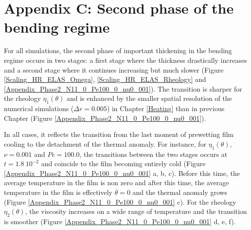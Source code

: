 \section*{Appendix C: Second phase of the bending regime}
\label{Heat:AppendixC}

For all simulations,  the second phase of important  thickening in the
bending regime occurs in two stages: a first stage where the thickness
drastically increases and a second stage where it continues increasing
but      much     slower      (Figure     \ref{Scaling_HR_ELAS_Omega},
\ref{Scaling_HR_ELAS_Rheology}                                     and
\ref{Appendix_Phase2_N11_0_Pe100_0_nu0_001}).    The   transition   is
sharper  for the  rheology  $\eta_1(\theta)$ and  is  enhanced by  the
smaller    spatial   resolution    of   the    numerical   simulations
($\Delta r = 0.005$) in Chapter \ref{Heating} than in previous Chapter
(Figure \ref{Appendix_Phase2_N11_0_Pe100_0_nu0_001}).

In  all cases,  it reflects  the transition  from the  last moment  of
prewetting film cooling to the  detachment of the thermal anomaly. For
instance,  for  $\eta_1(\theta)$,   $\nu=0.001$  and  $Pe=100.0$,  the
transitions  between  the two  stages  occurs  at $t=1.8~10^{-2}$  and
coincide    to   the    film    becoming    entirely   cold    (Figure
\ref{Appendix_Phase2_N11_0_Pe100_0_nu0_001}  a,  b, c).   Before  this
time, the average  temperature in the film is non  zero and after this
time,   the   average  temperature   in   the   film  is   effectively
$\overline{\theta}=0$   and   the   thermal  anomaly   grows   (Figure
\ref{Appendix_Phase2_N11_0_Pe100_0_nu0_001}  c).    For  the  rheology
$\eta_2(\theta)$,  the   viscosity  increases  on  a   wide  range  of
temperature    and     the    transition    is     smoother    (Figure
\ref{Appendix_Phase2_N11_0_Pe100_0_nu0_001} d, e, f).




